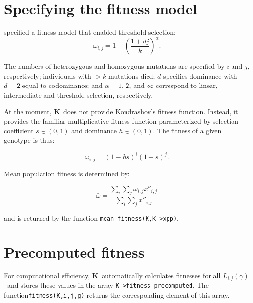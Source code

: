 \documentclass[12pt,twoside,letterpaper,fleqn]{report}
\numberwithin{equation}{section}  %
\newcommand{\K}{{\bf K}}
\newcommand{\KScalar}{\mbox{\tt KScalar}}
\newcommand{\xppij}{\mbox{$x''_{i,j}$}}
\newcommand{\Lijg}{\mbox{$L_{i,j}(\gamma)$}}     %
\begin{document}
{%
\section{Specifying the fitness model}


\citet{Kondrashov:1985:5375} specified a fitness model that enabled threshold selection:
\begin{equation}\label{eqn:kondrashovfitness}
\omega_{i,j}=1-\left({\frac{1+dj}{k}}\right)^\alpha.
\end{equation}

The numbers of heterozygous and homozygous mutations are specified by $i$ and
$j$, respectively; individuals with $>k$ mutations died; $d$ specifies
dominance with $d=2$ equal to codominance; and $\alpha=1$, $2$, and $\infty$
correspond to linear, intermediate and threshold selection, respectively.

At the moment, \K\ does not provide Kondrashov's fitness function.  Instead, it
provides the familiar multiplicative fitness function parameterized by
selection coefficient $s\in(0,1)$ and dominance $h\in(0,1)$.  The fitness of a
given genotype is thus:

\begin{equation}\label{eq:fitnessmultiplicative}
\omega_{i,j}=(1-hs)^{i}(1-s)^{j}.
\end{equation}

Mean population fitness is determined by:

\begin{equation}\label{eq:meanfitness}
\bar{\omega}=\frac{\sum_i{\sum_j{\omega_{i,j}\xppij}}}{\sum_i{\sum_j{\xppij}}}
\end{equation}

and is returned by the function \lstinline{mean_fitness(K,K->xpp)}.

\section{Precomputed fitness}
\label{section:precomputedfitness}

For computational efficiency, \K\ automatically calculates fitnesses for all
\Lijg\ and stores these values in the array \lstinline{K->fitness_precomputed}.
The function\linebreak \lstinline{fitness(K,i,j,g)} returns the corresponding
element of this array.

}
\end{document}
